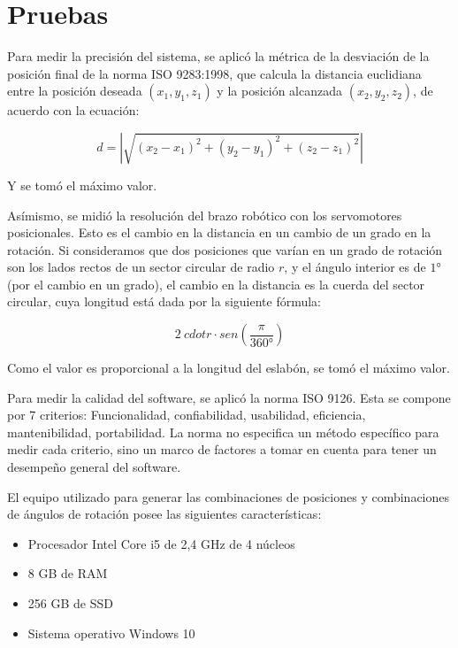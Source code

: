 \section{Pruebas}

Para medir la precisión del sistema, se aplicó la métrica de la desviación de la posición final de la norma ISO 9283:1998, que calcula la distancia euclidiana entre la posición deseada $(x_1, y_1, z_1)$ y la posición alcanzada $(x_2, y_2, z_2)$, de acuerdo con la ecuación:

\begin{equation}
	d = |\sqrt{(x_2 - x_1)^2 + (y_2 - y_1)^2 + (z_2 - z_1)^2}|
\end{equation}

Y se tomó el máximo valor.

Asímismo, se midió la resolución del brazo robótico con los servomotores posicionales. Esto es el cambio en la distancia en un cambio de un grado en la rotación. Si consideramos que dos posiciones que varían en un grado de rotación son los lados rectos de un sector circular de radio $r$, y el ángulo interior es de $1°$ (por el cambio en un grado), el cambio en la distancia es la cuerda del sector circular, cuya longitud está dada por la siguiente fórmula:

\begin{equation}
	2 \ cdot r \cdot sen(\frac{\pi}{360°})
\end{equation}

Como el valor es proporcional a la longitud del eslabón, se tomó el máximo valor. 

Para medir la calidad del software, se aplicó la norma ISO 9126. Esta se compone por 7 criterios: Funcionalidad, confiabilidad, usabilidad, eficiencia, mantenibilidad, portabilidad. La norma no especifica un método específico para medir cada criterio, sino un marco de factores a tomar en cuenta para tener un desempeño general del software. 

El equipo utilizado para generar las combinaciones de posiciones y combinaciones de ángulos de rotación posee las siguientes características:

\begin{itemize}
	\item Procesador Intel Core i5 de 2,4 GHz de 4 núcleos
	\item 8 GB de RAM
	\item 256 GB de SSD
	\item Sistema operativo Windows 10
\end{itemize}
